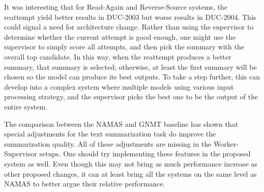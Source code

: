 \documentclass[letterpaper]{article} %
\begin{document}
It was interesting that for Read-Again and Reverse-Source systems, the reattempt yield better results in DUC-2003 but worse results in DUC-2004. This could signal a need for architecture change. Rather than using the supervisor to determine whether the current attempt is good enough, one might use the supervisor to simply score all attempts, and then pick the summary with the overall top candidate. In this way, when the reattempt produces a better summary, that summary is selected; otherwise, at least the first summary will be chosen so the model can produce its best outputs. To take a step further, this can develop into a complex system where multiple models using various input processing strategy, and the supervisor picks the best one to be the output of the entire system.

The comparison between the NAMAS and GNMT baseline has shown that special adjustments for the text summarization task do improve the summarization quality. All of these adjustments are missing in the Worker-Supervisor setups. One should try implementing these features in the proposed system as well. Even though this may not bring as much performance increase as other proposed changes, it can at least bring all the systems on the same level as NAMAS to better argue their relative performance.



\end{document}
